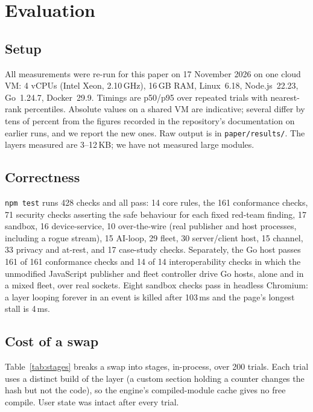 \documentclass[10pt,twocolumn]{article}
\newcommand{\code}[1]{\texttt{#1}}
\newcommand{\ms}{\,ms\xspace}
\begin{document}
\section{Evaluation}
\label{sec:eval}

\subsection{Setup}
\label{sec:setup}

All measurements were re-run for this paper on 17 November 2026 on one cloud VM: 4 vCPUs (Intel
Xeon, 2.10\,GHz), 16\,GB RAM, Linux~6.18, Node.js~22.23, Go~1.24.7, Docker~29.9. Timings are
p50/p95 over repeated trials with nearest-rank percentiles. Absolute values on a shared VM are
indicative; several differ by tens of percent from the figures recorded in the repository's
documentation on earlier runs, and we report the new ones. Raw output is in \code{paper/results/}.
The layers measured are 3--12\,KB; we have not measured large modules.

\subsection{Correctness}

\code{npm test} runs 428 checks and all pass: 14 core rules, the 161 conformance checks, 71
security checks asserting the safe behaviour for each fixed red-team finding, 17 sandbox, 16
device-service, 10 over-the-wire (real publisher and host processes, including a rogue stream),
15 AI-loop, 29 fleet, 30 server/client host, 15 channel, 33 privacy and at-rest, and 17
case-study checks. Separately, the Go host passes 161 of 161 conformance checks and 14 of 14
interoperability checks in which the unmodified JavaScript publisher and fleet controller drive
Go hosts, alone and in a mixed fleet, over real sockets. Eight sandbox checks pass in headless
Chromium: a layer looping forever in an event is killed after 103\ms and the page's longest stall
is 4\ms.

\subsection{Cost of a swap}

Table~\ref{tab:stages} breaks a swap into stages, in-process, over 200 trials. Each trial uses a
distinct build of the layer (a custom section holding a counter changes the hash but not the
code), so the engine's compiled-module cache gives no free compile. User state was intact after
every trial.
\end{document}
